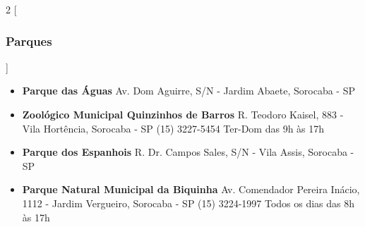 \begin{multicols}{2}
  [
  \subsubsection{Parques}
  ]
  \begin{itemize}
    \item \textbf{Parque das Águas}
      \newline Av. Dom Aguirre, S/N - Jardim Abaete, Sorocaba - SP
  \end{itemize}
  \begin{itemize}
    \item \textbf{Zoológico Municipal Quinzinhos de Barros}
      \newline R. Teodoro Kaisel, 883 - Vila Hortência, Sorocaba - SP
      \newline (15) 3227-5454
      \newline Ter-Dom das 9h às 17h
  \end{itemize}
  \begin{itemize}
    \item \textbf{Parque dos Espanhois}
      \newline R. Dr. Campos Sales, S/N - Vila Assis, Sorocaba - SP
  \end{itemize}
  \begin{itemize}
    \item \textbf{Parque Natural Municipal da Biquinha}
      \newline Av. Comendador Pereira Inácio, 1112 - Jardim Vergueiro, Sorocaba - SP
      \newline (15) 3224-1997
      \newline Todos os dias das 8h às 17h
  \end{itemize}
\end{multicols}


